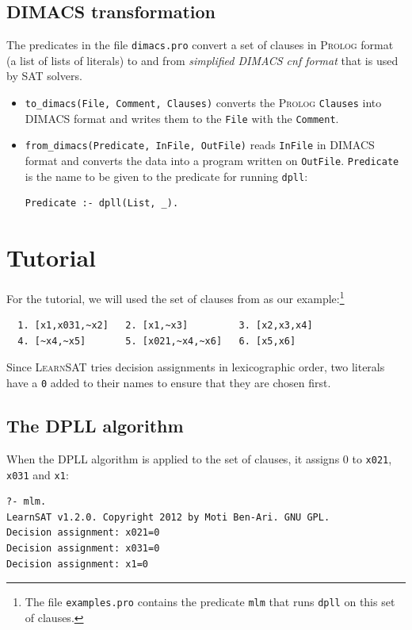 \documentclass[11pt]{report}
\newcommand*{\p}[1]{\textup{\texttt{#1}}}
\newcommand*{\ls}{\textsc{LearnSAT}}
\newcommand*{\pl}{\textsc{Prolog}}
\begin{document}
\section{DIMACS transformation}

The predicates in the file \p{dimacs.pro} convert a set of clauses in
\pl{} format (a list of lists of literals) to and from \emph{simplified
DIMACS cnf format} that is used by SAT solvers.
\begin{itemize}
\item \p{to\_dimacs(File, Comment, Clauses)} converts the \pl{}
\p{Clauses} into DIMACS format and writes them to the \p{File} with the
\p{Comment}.
\item \p{from\_dimacs(Predicate, InFile, OutFile)} reads \p{InFile} in
DIMACS format and converts the data into a program written on
\p{OutFile}. \p{Predicate} is the name to be given to the predicate for
running \p{dpll}:
\begin{verbatim}
Predicate :- dpll(List, _).
\end{verbatim}
\end{itemize}



\chapter{Tutorial}

For the tutorial, we will used the set of clauses from \cite{mlm} as our
example:\footnote{The file \p{examples.pro} contains the predicate
\p{mlm} that runs \p{dpll} on this set of clauses.}

\begin{verbatim}
  1. [x1,x031,~x2]   2. [x1,~x3]         3. [x2,x3,x4]
  4. [~x4,~x5]       5. [x021,~x4,~x6]   6. [x5,x6]
\end{verbatim}

Since \ls{} tries decision assignments in lexicographic order, two
literals have a \p{0} added to their names to ensure that they are
chosen first.

\section{The DPLL algorithm}

When the DPLL algorithm is applied to the set of clauses, it assigns
0 to \p{x021}, \p{x031} and \p{x1}:

\begin{verbatim}
?- mlm.
LearnSAT v1.2.0. Copyright 2012 by Moti Ben-Ari. GNU GPL.
Decision assignment: x021=0
Decision assignment: x031=0
Decision assignment: x1=0
\end{verbatim}
\end{document}

